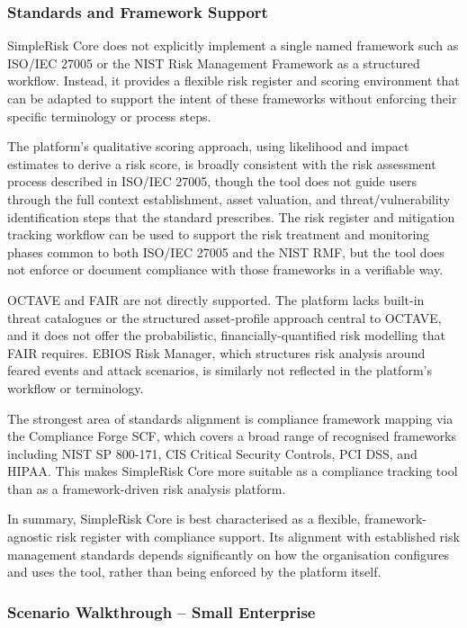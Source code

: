 \subsubsection{Standards and Framework Support}
SimpleRisk Core does not explicitly implement a single named framework such as ISO/IEC
27005 or the NIST Risk Management Framework as a structured workflow. Instead, it
provides a flexible risk register and scoring environment that can be adapted to support
the intent of these frameworks without enforcing their specific terminology or process
steps.

The platform's qualitative scoring approach, using likelihood and impact estimates to
derive a risk score, is broadly consistent with the risk assessment process described
in ISO/IEC 27005, though the tool does not guide users through the full context
establishment, asset valuation, and threat/vulnerability identification steps that the
standard prescribes. The risk register and mitigation tracking workflow can be used to
support the risk treatment and monitoring phases common to both ISO/IEC 27005 and the
NIST RMF, but the tool does not enforce or document compliance with those frameworks
in a verifiable way.

OCTAVE and FAIR are not directly supported. The platform lacks built-in threat catalogues
or the structured asset-profile approach central to OCTAVE, and it does not offer the
probabilistic, financially-quantified risk modelling that FAIR requires. EBIOS Risk
Manager, which structures risk analysis around feared events and attack scenarios, is
similarly not reflected in the platform's workflow or terminology.

The strongest area of standards alignment is compliance framework mapping via the
Compliance Forge SCF, which covers a broad range of recognised frameworks including
NIST SP 800-171, CIS Critical Security Controls, PCI DSS, and HIPAA. This makes
SimpleRisk Core more suitable as a compliance tracking tool than as a framework-driven
risk analysis platform.

In summary, SimpleRisk Core is best characterised as a flexible, framework-agnostic
risk register with compliance support. Its alignment with established risk management
standards depends significantly on how the organisation configures and uses the tool,
rather than being enforced by the platform itself.

\subsubsection{Scenario Walkthrough -- Small Enterprise}
\label{sec:simplerisk-walkthrough-small}

